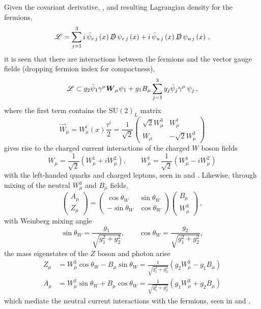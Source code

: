 Given the covariant derivative, , and resulting Lagrangian density for the fermions,
\[
 \mathscr{L} = \sum_{j=1}^{3} i \,\bar{\psi}_{e\,j}\left(x\right) \slashed{D} \,\psi_{e\,j}\left(x\right) + i \,\bar{\psi}_{u\,j}\left(x\right) \slashed{D} \,\psi_{u\,j}\left(x\right)\,,
\]
it is seen that there are interactions between the fermions and the vector gauge fields (dropping fermion index for compactness),
\[
 \mathscr{L} \subset g_{2} \bar{\psi}_{1} \gamma^{\mu}\boldsymbol{W}_{\mu} \psi_{1} + g_{1} B_{\mu} \sum_{j=1}^{3} y_{j}\bar{\psi}_{j} \gamma^{\mu} \,\psi_{j}\,,
\]
where the first term contains the $\mathrm{SU}(2)_{L}$ matrix
\[
 \vec{W}_{\mu} = W_{\mu}^{i}(x) \frac{\tau^{i}}{2} = \frac{1}{\sqrt{2}} \begin{pmatrix}%
  \sqrt{2} W_{\mu}^{3} & W_{\mu}^{\dagger}     \\
  W_{\mu}              & -\sqrt{2} W_{\mu}^{3}
 \end{pmatrix}
\]
gives rise to the charged current interactions of the charged $W$ boson fields
\[
 W_{\mu} = \frac{1}{\sqrt{2}} \left(W_{\mu}^{1}  + i W_{\mu}^{2}\right), \qquad W_{\mu}^{\dagger} = \frac{1}{\sqrt{2}} \left(W_{\mu}^{1}  - i W_{\mu}^{2}\right)
\]
with the left-handed quarks and charged leptons, seen in  and .
Likewise, through mixing of the neutral $W_{\mu}^{3}$ and $B_{\mu}$ fields,
\[
 \begin{pmatrix}
  A_{\mu} \\
  Z_{\mu}
 \end{pmatrix}
 = \begin{pmatrix}
  \cos\theta_{W}  & \sin\theta_{W} \\
  -\sin\theta_{W} & \cos\theta_{W}
 \end{pmatrix}
 \begin{pmatrix}
  B_{\mu} \\
  W_{\mu}^{3}
 \end{pmatrix}\,,
\]
with Weinberg mixing angle
\[
 \sin\theta_{W} = \frac{g_{1}}{\sqrt{g_{1}^{2} + g_{2}^{2}}}, \qquad \cos\theta_{W} = \frac{g_{2}}{\sqrt{g_{1}^{2} + g_{2}^{2}}},
\]
the mass eigenstates of the $Z$ boson and photon arise
\[
 \begin{split}
  Z_{\mu} &= W_{\mu}^{3} \cos\theta_{W} - B_{\mu} \sin\theta_{W} = \frac{1}{\sqrt{g_{1}^{2} + g_{2}^{2}}} \left(g_{2} W_{\mu}^{3} - g_{1} B_{\mu}\right) \\
  A_{\mu} &= W_{\mu}^3 \sin\theta_{W} + B_{\mu} \cos\theta_{W} = \frac{1}{\sqrt{g_{1}^{2} + g_{2}^{2}}} \left(g_{1} W_{\mu}^{3} + g_{2} B_{\mu}\right)
 \end{split}
\]
which mediate the neutral current interactions with the fermions, seen in  and .

